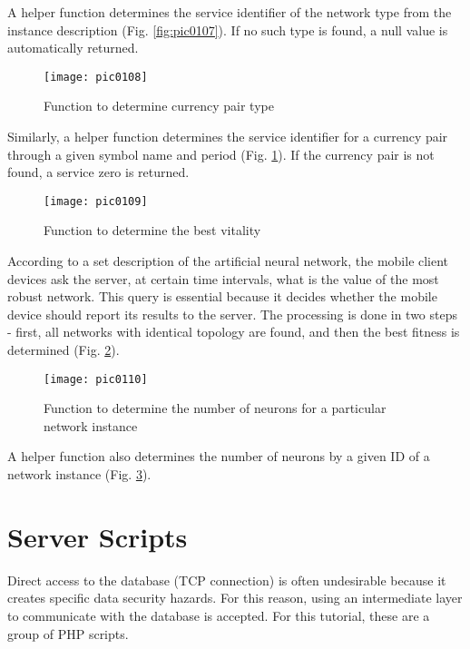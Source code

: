 A helper function determines the service identifier of the network type from the instance description (Fig. \ref{fig:pic0107}). If no such type is found, a null value is automatically returned.

\begin{figure}[h]
\centering
\texttt{[image: pic0108]}
\caption{Function to determine currency pair type}
\label{fig:pic0108}
\end{figure}
\FloatBarrier

Similarly, a helper function determines the service identifier for a currency pair through a given symbol name and period (Fig. \ref{fig:pic0108}). If the currency pair is not found, a service zero is returned.

\begin{figure}[h]
\centering
\texttt{[image: pic0109]}
\caption{Function to determine the best vitality}
\label{fig:pic0109}
\end{figure}
\FloatBarrier

According to a set description of the artificial neural network, the mobile client devices ask the server, at certain time intervals, what is the value of the most robust network. This query is essential because it decides whether the mobile device should report its results to the server. The processing is done in two steps - first, all networks with identical topology are found, and then the best fitness is determined (Fig. \ref{fig:pic0109}).

\begin{figure}[h]
\centering
\texttt{[image: pic0110]}
\caption{Function to determine the number of neurons for a particular network instance}
\label{fig:pic0110}
\end{figure}
\FloatBarrier

A helper function also determines the number of neurons by a given ID of a network instance (Fig. \ref{fig:pic0110}).

\section{Server Scripts}

Direct access to the database (TCP connection) is often undesirable because it creates specific data security hazards. For this reason, using an intermediate layer to communicate with the database is accepted. For this tutorial, these are a group of PHP scripts.

